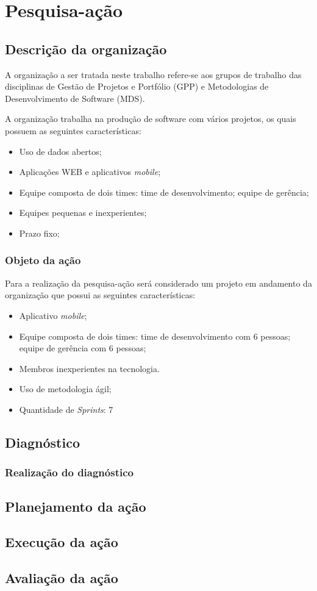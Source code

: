 \chapter{Pesquisa-ação}
\label{pesquisa_acao}
	\section{Descrição da organização}

		A organização a ser tratada neste trabalho refere-se aos grupos de trabalho das disciplinas de Gestão de Projetos 
		e Portfólio (GPP) e Metodologias de Desenvolvimento de Software (MDS).

		A organização trabalha na produção de software com vários projetos, os quais possuem as seguintes características:

		\begin{itemize}
			\item Uso de dados abertos;
			\item Aplicações WEB e aplicativos \textit{mobile};
			\item Equipe composta de dois times:
				 time de desenvolvimento;
				 equipe de gerência;
			\item Equipes pequenas e inexperientes;
			\item Prazo fixo;
		\end{itemize}

		\subsection{Objeto da ação}

		Para a realização da pesquisa-ação será considerado um projeto em andamento da organização que possui as seguintes características:


		\begin{itemize}
			\item Aplicativo \textit{mobile};
			\item Equipe composta de dois times:
				 time de desenvolvimento com 6 pessoas;
				 equipe de gerência com 6 pessoas;
			\item Membros inexperientes na tecnologia.
			\item Uso de metodologia ágil;
			\item Quantidade de \textit{Sprints}: 7
		\end{itemize}



\section{Diagnóstico}
	



	\subsection{Realização do diagnóstico}



\section{Planejamento da ação}
\section{Execução da ação}
\section{Avaliação da ação}